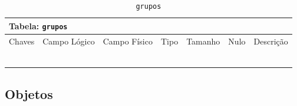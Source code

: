 \documentclass[12pt,a4paper]{article}
\begin{document}
\begin{center}
\begin{table}[h!]
	\caption{\texttt{grupos}}
	\label{tabela:grupos}
	\begin{tabular}{|p{1cm}|p{1.5cm}|p{1.25cm}|p{1.25cm}|p{1.75cm}|p{1.25cm}|p{4.5cm}|}\hline	
		\multicolumn{7}{|p{16cm}|}{\cellcolor{cinzaClaro}  \centering Tabela: \texttt{grupos}} \\ \hline %
		{\small Chaves} & {\small Campo Lógico} & {\small Campo Físico} & {\small Tipo} & {\small Tamanho} & {\small Nulo} & {\small Descrição}\\\hline %
		
		{\tiny } & {\tiny } & {\tiny } & {\tiny } & {\tiny } & {\tiny } &{\tiny }\\\hline
		{\tiny } & {\tiny } & {\tiny } & {\tiny } & {\tiny } & {\tiny } &{\tiny }\\\hline
		{\tiny } & {\tiny } & {\tiny } & {\tiny } & {\tiny } & {\tiny } &{\tiny }\\\hline
		{\tiny } & {\tiny } & {\tiny } & {\tiny } & {\tiny } & {\tiny } &{\tiny }\\\hline
		{\tiny } & {\tiny } & {\tiny } & {\tiny } & {\tiny } & {\tiny } &{\tiny }\\\hline
		{\tiny } & {\tiny } & {\tiny } & {\tiny } & {\tiny } & {\tiny } &{\tiny }\\\hline
		
			
	\end{tabular}
\end{table}	
\end{center}



\subsection{Objetos}

\end{document}
